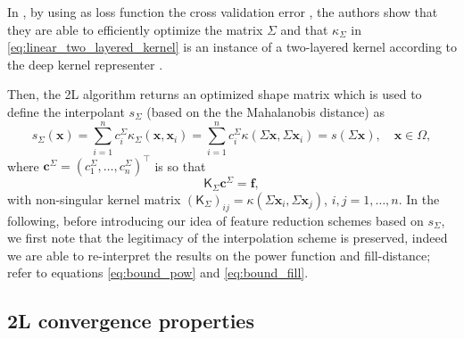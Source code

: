 \documentclass[hyphens,a4paper,11pt]{article}
\newcommand{\mK}{\mathsf{K}}
\newcommand{\mSigma}{\mathsf{\Sigma}}
\begin{document}
In \cite{Wenzel}, by using as loss function the cross validation error \cite{marchetti2021extension}, the authors show that they are able to efficiently optimize the matrix $\mSigma$ and that $\kappa_{\mSigma}$ in \eqref{eq:linear_two_layered_kernel} is an instance of a two-layered kernel according to the deep kernel representer \cite[Theorem 1]{bohn2019representer}. 

Then, the 2L algorithm returns an optimized shape matrix which is used to define the interpolant $s_{\mSigma}$ (based on the the Mahalanobis distance) as
\begin{equation} \label{eq:optimal_kernel}
    s_{\mSigma}(\boldsymbol{x})  = \sum_{i=1}^n c^{\mSigma}_i \kappa_{\mSigma}(\boldsymbol{x},\boldsymbol{x}_i) = \sum_{i=1}^n c^{\mSigma}_i \kappa(\mSigma \boldsymbol{x}, \mSigma \boldsymbol{x}_i) = s( \mSigma \boldsymbol{x}), \quad \boldsymbol{x} \in \Omega, 
\end{equation}
where $\boldsymbol{c}^{\mSigma}=({c}_1^{\mSigma}, \ldots, {c}_n^{\mSigma})^{\intercal}$ is so that
\begin{equation} \label{eq:sys_sig}
    \mK_{\mSigma}  \boldsymbol{c}^{\mSigma} = \boldsymbol{f}, 
\end{equation}
with non-singular kernel matrix $(\mK_{\mSigma})_{ij} = \kappa(\mSigma \boldsymbol{x}_i, \mSigma \boldsymbol{x}_j) $, $i,j=1,\ldots, n$.  In the following, before introducing our idea of feature reduction schemes based on $s_{\mSigma}$, we first note that the legitimacy of the interpolation scheme is preserved, indeed we are able to re-interpret the results on the power function and fill-distance; refer to equations \eqref{eq:bound_pow} and \eqref{eq:bound_fill}.

\subsection{2L convergence properties}
\end{document}
